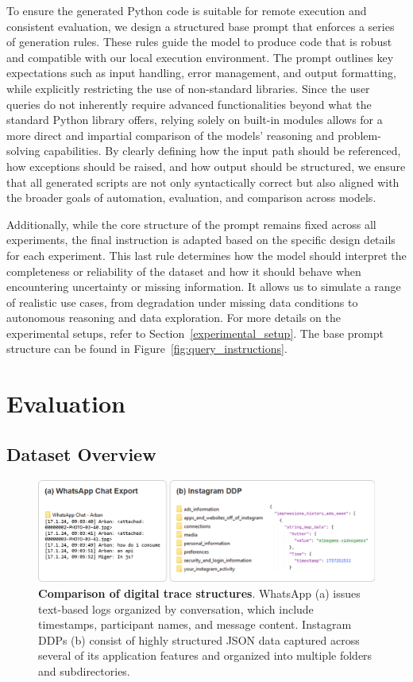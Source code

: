 \documentclass{DESSThesis}
\begin{document}
To ensure the generated Python code is suitable for remote execution and consistent evaluation, we design a structured base prompt that enforces a series of generation rules. These rules guide the model to produce code that is robust and compatible with our local execution environment. The prompt outlines key expectations such as input handling, error management, and output formatting, while explicitly restricting the use of non-standard libraries. Since the user queries do not inherently require advanced functionalities beyond what the standard Python library offers, relying solely on built-in modules allows for a more direct and impartial comparison of the models' reasoning and problem-solving capabilities. By clearly defining how the input path should be referenced, how exceptions should be raised, and how output should be structured, we ensure that all generated scripts are not only syntactically correct but also aligned with the broader goals of automation, evaluation, and comparison across models. 

Additionally, while the core structure of the prompt remains fixed across all experiments, the final instruction is adapted based on the specific design details for each experiment. This last rule determines how the model should interpret the completeness or reliability of the dataset and how it should behave when encountering uncertainty or missing information. It allows us to simulate a range of realistic use cases, from degradation under missing data conditions to autonomous reasoning and data exploration. For more details on the experimental setups, refer to Section~\ref{experimental_setup}. The base prompt structure can be found in Figure~\ref{fig:query_instructions}.

\section{Evaluation}

\subsection{Dataset Overview}

\begin{figure}[!b]
    \centering
    \includegraphics[width=1\linewidth]{img/Methodology/structure-comparison.png}
    \caption[Comparison of digital trace structures]{\textbf{Comparison of digital trace structures}. WhatsApp (a) issues text-based logs organized by conversation, which include timestamps, participant names, and message content. Instagram DDPs (b) consist of highly structured JSON data captured across several of its application features and organized into multiple folders and subdirectories.}
    \label{fig:structure_comparison}
\end{figure}
\end{document}

